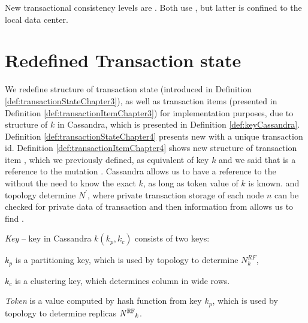 New transactional consistency levels are . Both use \mpt, but latter is confined to the local data center.

\section{Redefined Transaction state}
We redefine structure of transaction state \txState (introduced in Definition \ref{def:transactionStateChapter3}), as well as transaction items \txItems (presented in Definition \ref{def:transactionItemChapter3}) for implementation purposes, due to structure of $k$ in Cassandra, which is presented in Definition \ref{def:keyCassandra}. Definition \ref{def:transactionStateChapter4} presents new \txState with a unique transaction id. Definition \ref{def:transactionItemChapter4} shows new structure of transaction item \txItem, which we previously defined, as equivalent of key $k$ and we said that \txItem is a reference to the mutation . Cassandra allows us to have a reference to the  without the need to know the exact $k$, as long as token value of $k$ is known. \txItem and topology \topology determine $N^'$, where private transaction storage \txStorage of each node $n$ can be checked for private data of transaction \transaction and then information from \txItem allows us to find .


\begin{definition}
\label{def:keyCassandra}
\emph{Key} -- key in Cassandra $k(k_p,k_c)$ consists of two keys: 
\begin{enumerate*}[label=\alph*)]
\item $k_p$ is a partitioning key, which is used by topology \topology to determine $\mathit{N}^{RF}_k$,
\item $k_c$ is a clustering key, which determines column in wide rows.
\end{enumerate*}
\end{definition}

\begin{definition}
\label{def:tokenChapter4}
\emph{Token} is a value computed by hash function from key $k_p$, which is used by topology \topology to determine replicas $\mathit{N^{\mathbb{RF}}}_k$.
\end{definition}


